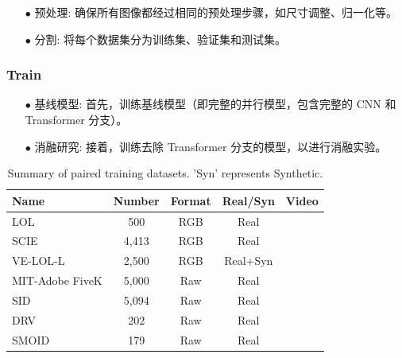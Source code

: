 \documentclass[a4paper, 10pt]{article}
\begin{document}
		\begin{itemize}
			\item [$\bullet$]
			预处理: 确保所有图像都经过相同的预处理步骤，如尺寸调整、归一化等。
			
			\item [$\bullet$]
			分割: 将每个数据集分为训练集、验证集和测试集。
		\end{itemize}
		
		\subsubsection{Train}
		
		\begin{itemize}
			\item [$\bullet$]
			基线模型: 首先，训练基线模型（即完整的并行模型，包含完整的 CNN 和 Transformer 分支）。
			
			\item [$\bullet$]
			消融研究: 接着，训练去除 Transformer 分支的模型，以进行消融实验。
		\end{itemize}
		
		\begin{table}[!htbp]
			\centering
			\tiny
				\begin{tabular}{>{\centering\arraybackslash}m{2.5cm}|c|c|c|c}
					
					\hline
					
					\textbf{Name} & \textbf{Number} & \textbf{Format} & \textbf{Real/Syn} & \textbf{Video} \\
					
					\hline
					
					LOL\cite{wei2018deep} & 500 & RGB & Real & \\
					
					SCIE\cite{cai2018learning} & 4,413 & RGB & Real & \\
					
					VE-LOL-L\cite{jiang2019learning} & 2,500 & RGB & Real+Syn & \\
					
					MIT-Adobe FiveK\cite{bychkovsky2011learning} & 5,000 & Raw & Real & \\
					
					SID\cite{wei2018deep} & 5,094 & Raw & Real & \\
					
					DRV\cite{chen2019seeing} & 202 & Raw & Real & \checkmark  \\
					
					SMOID\cite{jiang2019learning} & 179 & Raw & Real & \checkmark  \\
					
					\hline
					
				\end{tabular}
			\captionsetup{font=scriptsize} %
			\caption{\label{tab: Paired_training_datases}
				Summary of paired training datasets. 'Syn' represents Synthetic.} %
			
		\end{table}
		
\end{document}
